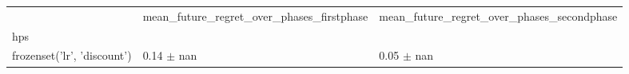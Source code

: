 \begin{tabular}{lll}
\toprule
 & mean_future_regret_over_phases_firstphase & mean_future_regret_over_phases_secondphase \\
hps &  &  \\
\midrule
frozenset({'lr', 'discount'}) & 0.14 $\pm$ nan & 0.05 $\pm$ nan \\
\bottomrule
\end{tabular}
